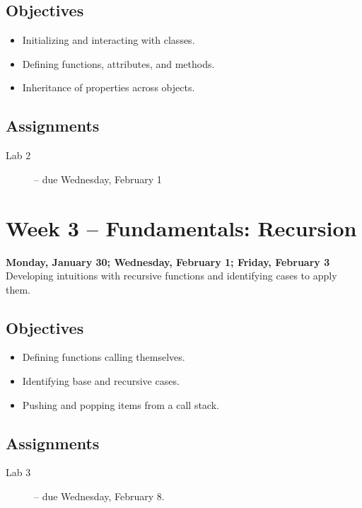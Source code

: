 \documentclass[10pt]{memoir}
\begin{document}
    \subsection{Objectives}
    \begin{itemize}
        \item Initializing and interacting with classes.
        \item Defining functions, attributes, and methods.
        \item Inheritance of properties across objects.
    \end{itemize}

    \subsection{Assignments}
    \begin{description}
        \item[Lab 2 ] -- due Wednesday, February 1 %
    \end{description}

\section{Week 3 -- Fundamentals: Recursion}
\textcolor{CUGold}{\textbf{Monday, January 30; Wednesday, February 1; Friday, February 3}}\\
Developing intuitions with recursive functions and identifying cases to apply them.

    \subsection{Objectives}
    \begin{itemize}
        \item Defining functions calling themselves.
        \item Identifying base and recursive cases.
        \item Pushing and popping items from a call stack.
    \end{itemize}

    \subsection{Assignments}
    \begin{description}
        \item[Lab 3 ] -- due Wednesday, February 8.
    \end{description}
\end{document}
